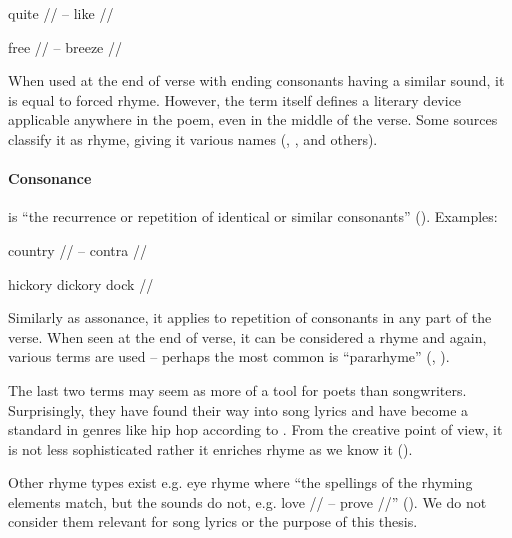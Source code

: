 quite // -- like //

free // -- breeze //

\noindent When used at the end of verse with ending consonants having a similar sound, it is equal to forced rhyme. However, the term itself defines a literary device applicable anywhere in the poem, even in the middle of the verse. Some sources classify it as rhyme, giving it various names (\cite{vanphonological}, \cite{bergman2017litcharts}, and others).

\paragraph{Consonance} is ``the recurrence or repetition of identical or similar consonants'' (\cite{britannica}). Examples: 

country // -- contra //

hickory dickory dock //

\noindent Similarly as assonance, it applies to repetition of consonants in any part of the verse. When seen at the end of verse, it can be considered a rhyme and again, various terms are used -- perhaps the most common is ``pararhyme'' (\cite{britannica}, \cite{oxforddict2008literary}).
\newline

The last two terms may seem as more of a tool for poets than songwriters. Surprisingly, they have found their way into song lyrics and have become a standard in genres like hip hop according to \cite{vanphonological}. From the creative point of view, it is not less sophisticated rather it enriches rhyme as we know it (\cite{brogan2016poeticterms}).


Other rhyme types exist e.g. eye rhyme where ``the spellings of the rhyming elements match, but the sounds do not, e.g. love // -- prove //'' (\cite{oxforddict2008literary}). We do not consider them relevant for song lyrics or the purpose of this thesis.


